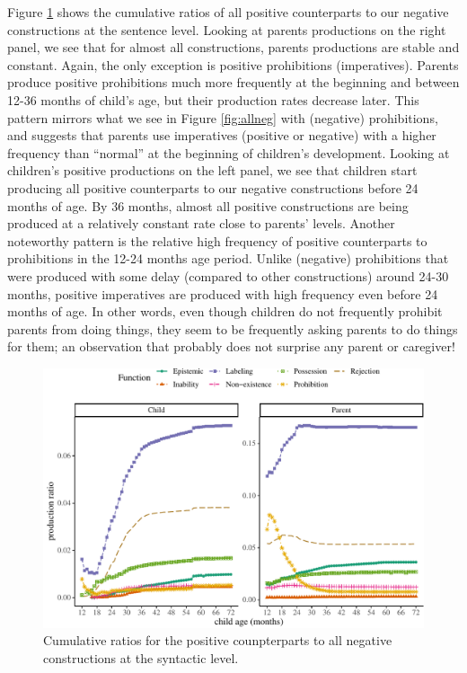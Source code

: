 \documentclass[
  english,
  man,floatsintext]{apa6}
\begin{document}
Figure \ref{fig:allpos} shows the cumulative ratios of all positive counterparts to our negative constructions at the sentence level. Looking at parents productions on the right panel, we see that for almost all constructions, parents productions are stable and constant. Again, the only exception is positive prohibitions (imperatives). Parents produce positive prohibitions much more frequently at the beginning and between 12-36 months of child's age, but their production rates decrease later. This pattern mirrors what we see in Figure \ref{fig:allneg} with (negative) prohibitions, and suggests that parents use imperatives (positive or negative) with a higher frequency than ``normal'' at the beginning of children's development. Looking at children's positive productions on the left panel, we see that children start producing all positive counterparts to our negative constructions before 24 months of age. By 36 months, almost all positive constructions are being produced at a relatively constant rate close to parents' levels. Another noteworthy pattern is the relative high frequency of positive counterparts to prohibitions in the 12-24 months age period. Unlike (negative) prohibitions that were produced with some delay (compared to other constructions) around 24-30 months, positive imperatives are produced with high frequency even before 24 months of age. In other words, even though children do not frequently prohibit parents from doing things, they seem to be frequently asking parents to do things for them; an observation that probably does not surprise any parent or caregiver!

\begin{figure}[H]

{\centering \includegraphics{neg_construction_article_files/figure-latex/allpos-1} 

}

\caption{Cumulative ratios for the positive counpterparts to all negative constructions at the syntactic level.}\label{fig:allpos}
\end{figure}
\end{document}
